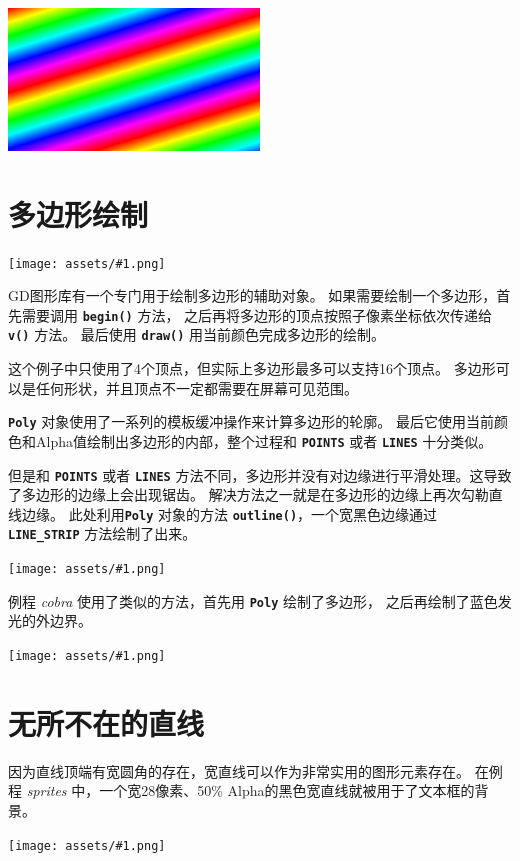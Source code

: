 \documentclass[10pt]{book}
\newcommand{\png}[1]{
\begin{center}
\texttt{[image: assets/\#1.png]}
\end{center}
}
\newcommand{\mach}[1]{\texttt{\textbf{#1}}}
\begin{document}
\begin{CJK}{UTF8}{gkai}
\begin{center}
\includegraphics[width=0.5\textwidth]{assets/0054.png}
\end{center}

\newpage
\section{多边形绘制}

\png{0050}

GD图形库有一个专门用于绘制多边形的辅助对象。
如果需要绘制一个多边形，首先需要调用 \mach{begin()} 方法，
之后再将多边形的顶点按照子像素坐标依次传递给 \mach{v()} 方法。
最后使用 \mach{draw()} 用当前颜色完成多边形的绘制。

这个例子中只使用了4个顶点，但实际上多边形最多可以支持16个顶点。
多边形可以是任何形状，并且顶点不一定都需要在屏幕可见范围。

\mach{Poly} 对象使用了一系列的模板缓冲操作来计算多边形的轮廓。
最后它使用当前颜色和Alpha值绘制出多边形的内部，整个过程和 \mach{POINTS} 或者 \mach{LINES} 十分类似。


\newpage
但是和 \mach{POINTS} 或者 \mach{LINES} 方法不同，多边形并没有对边缘进行平滑处理。这导致了多边形的边缘上会出现锯齿。
解决方法之一就是在多边形的边缘上再次勾勒直线边缘。
此处利用\mach{Poly} 对象的方法 \mach{outline()}，一个宽黑色边缘通过
\mach{LINE\_STRIP} 方法绘制了出来。


\png{0051}

例程 \textit{cobra} 使用了类似的方法，首先用 \mach{Poly} 绘制了多边形，
之后再绘制了蓝色发光的外边界。
\png{cobra}

\newpage
\section{无所不在的直线}

因为直线顶端有宽圆角的存在，宽直线可以作为非常实用的图形元素存在。
在例程 \textit{sprites} 中，一个宽28像素、50\% Alpha的黑色宽直线就被用于了文本框的背景。
\png{lines-el}


\end{CJK}
\end{document}
